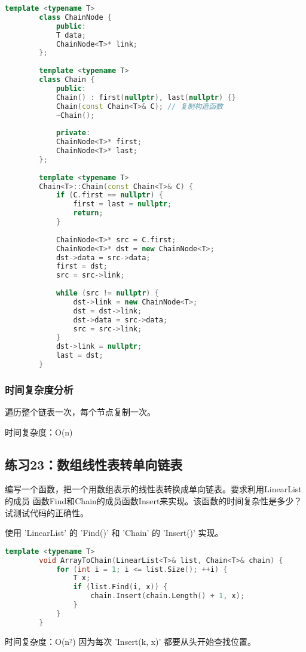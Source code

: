 \documentclass[UTF8]{ctexart}
\begin{document}
	\begin{lstlisting}[language=C++]
		template <typename T>
		class ChainNode {
			public:
			T data;
			ChainNode<T>* link;
		};
		
		template <typename T>
		class Chain {
			public:
			Chain() : first(nullptr), last(nullptr) {}
			Chain(const Chain<T>& C); // 复制构造函数
			~Chain();
			
			private:
			ChainNode<T>* first;
			ChainNode<T>* last;
		};
		
		template <typename T>
		Chain<T>::Chain(const Chain<T>& C) {
			if (C.first == nullptr) {
				first = last = nullptr;
				return;
			}
			
			ChainNode<T>* src = C.first;
			ChainNode<T>* dst = new ChainNode<T>;
			dst->data = src->data;
			first = dst;
			src = src->link;
			
			while (src != nullptr) {
				dst->link = new ChainNode<T>;
				dst = dst->link;
				dst->data = src->data;
				src = src->link;
			}
			dst->link = nullptr;
			last = dst;
		}
	\end{lstlisting}
	
	\subsubsection*{时间复杂度分析}
	
	遍历整个链表一次，每个节点复制一次。
	
	 时间复杂度：O(n)
	
	
	
	\subsection*{练习23：数组线性表转单向链表}
	编写一个函数，把一个用数组表示的线性表转换成单向链表。要求利用LinearList的成员
	函数Find和Chain的成员函数Insert来实现。该函数的时间复杂性是多少？试测试代码的正确性。
	
	使用 'LinearList' 的 'Find()' 和 'Chain' 的 'Insert()' 实现。
	
	\begin{lstlisting}[language=C++]
		template <typename T>
		void ArrayToChain(LinearList<T>& list, Chain<T>& chain) {
			for (int i = 1; i <= list.Size(); ++i) {
				T x;
				if (list.Find(i, x)) {
					chain.Insert(chain.Length() + 1, x);
				}
			}
		}
	\end{lstlisting}
	
	 时间复杂度：O(n²)  
	因为每次 'Insert(k, x)' 都要从头开始查找位置。
	
\end{document}
